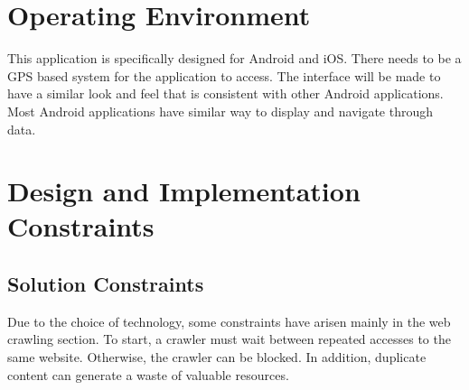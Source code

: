 \documentclass{scrreprt}
\begin{document}

\section{Operating Environment}

This application is specifically designed for Android and iOS. There needs to be a GPS based system for the application to access. The interface will be made to have a similar look and feel that is consistent with other Android applications. Most Android applications have similar way to display and navigate through data.

\newpage
\section{Design and Implementation Constraints}

\subsection{Solution Constraints}
Due to the choice of technology, some constraints have arisen mainly in the web crawling section. To start, a crawler must wait between repeated accesses to the same website. Otherwise, the crawler can be blocked. In addition, duplicate content can generate a waste of valuable resources.
\end{document}
